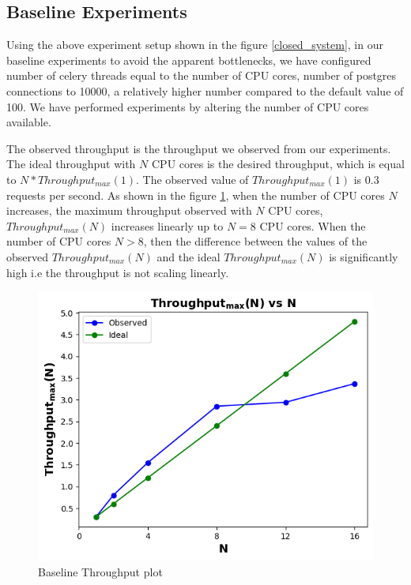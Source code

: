 \documentclass[sigconf]{acmart}
\begin{document}
\subsection{Baseline Experiments}\label{baseline_16}
Using the above experiment setup shown in the figure \ref{closed_system}, in our baseline experiments to avoid the apparent bottlenecks,  we have configured number of celery  threads equal to the number of CPU cores, number of postgres connections to 10000, a relatively higher number compared to the default value of 100. We have performed experiments by altering the number of CPU cores available.

The observed throughput is the throughput we observed from our experiments. The ideal throughput with $N$ CPU cores is the desired throughput, which is equal to $N*Throughput_{max}(1)$. The observed value of $Throughput_{max}(1)$ is 0.3 requests per second. As shown in the figure \ref{baseline_throughput_plot}, when the number of CPU cores $N$ increases, the maximum throughput observed with $N$ CPU cores, $Throughput_{max}(N)$ increases linearly up to $N=8$ CPU cores. When the number of CPU cores $N>8$, then the difference between the values of the observed  $Throughput_{max}(N)$  and the ideal $Throughput_{max}(N)$ is significantly high i.e the throughput is not scaling linearly.


\begin{figure}[!htb]
  \centering
  \includegraphics[width=\linewidth]{Pictures/baseline_16_cores.png}
  \caption{Baseline Throughput plot}
  \label{baseline_throughput_plot}
\end{figure}
\end{document}
